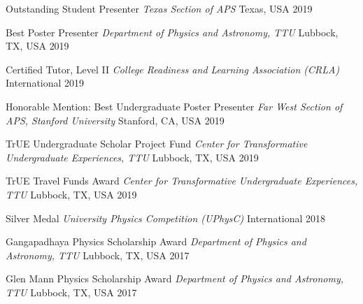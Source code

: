 \begin{cvhonors}
    \cvhonor
    {Outstanding Student Presenter}
    {\textit{\scriptsize Texas Section of APS}}
    {Texas, USA}
    {2019}

    \cvhonor
    {Best Poster Presenter}
    {\textit{\scriptsize Department of Physics and Astronomy, TTU}}
    {Lubbock, TX, USA}
    {2019}

    \cvhonor
    {Certified Tutor, Level II}
    {\textit{\scriptsize College Readiness and Learning Association (CRLA)}}
    {International}
    {2019}

    \cvhonor
    {Honorable Mention: Best Undergraduate Poster Presenter}
    {\textit{\scriptsize Far West Section of APS, Stanford University}}
    {Stanford, CA, USA}
    {2019}

    \cvhonor
    {TrUE Undergraduate Scholar Project Fund}
    {\textit{\scriptsize Center for Transformative Undergraduate Experiences, TTU}}
    {Lubbock, TX, USA}
    {2019}

    \cvhonor
    {TrUE Travel Funds Award}
    {\textit{\scriptsize Center for Transformative Undergraduate Experiences, TTU}}
    {Lubbock, TX, USA}
    {2019}

    \cvhonor
    {Silver Medal}
    {\textit{\scriptsize University Physics Competition (UPhysC)}}
    {International}
    {2018}

    \cvhonor
    {Gangapadhaya Physics Scholarship Award}
    {\textit{\scriptsize Department of Physics and Astronomy, TTU}}
    {Lubbock, TX, USA}
    {2017}

    \cvhonor
    {Glen Mann Physics Scholarship Award}
    {\textit{\scriptsize Department of Physics and Astronomy, TTU}}
    {Lubbock, TX, USA}
    {2017}

\end{cvhonors}
